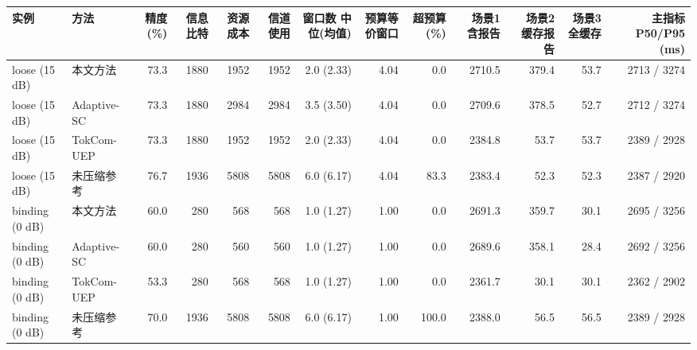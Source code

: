 \begin{tabular}{llrrrrrrrrrrr}
\hline
实例 & 方法 & 精度 (\%) & 信息比特 & 资源成本 & 信道使用 & 窗口数 中位(均值) & 预算等价窗口 & 超预算 (\%) & 场景1 含报告 & 场景2 缓存报告 & 场景3 全缓存 & 主指标 P50/P95 (ms)\\
\hline
loose (15 dB) & 本文方法 & 73.3 & 1880 & 1952 & 1952 & 2.0 (2.33) & 4.04 & 0.0 & 2710.5 & 379.4 & 53.7 & 2713 / 3274\\
loose (15 dB) & Adaptive-SC & 73.3 & 1880 & 2984 & 2984 & 3.5 (3.50) & 4.04 & 0.0 & 2709.6 & 378.5 & 52.7 & 2712 / 3274\\
loose (15 dB) & TokCom-UEP & 73.3 & 1880 & 1952 & 1952 & 2.0 (2.33) & 4.04 & 0.0 & 2384.8 & 53.7 & 53.7 & 2389 / 2928\\
loose (15 dB) & 未压缩参考 & 76.7 & 1936 & 5808 & 5808 & 6.0 (6.17) & 4.04 & 83.3 & 2383.4 & 52.3 & 52.3 & 2387 / 2920\\
binding (0 dB) & 本文方法 & 60.0 & 280 & 568 & 568 & 1.0 (1.27) & 1.00 & 0.0 & 2691.3 & 359.7 & 30.1 & 2695 / 3256\\
binding (0 dB) & Adaptive-SC & 60.0 & 280 & 560 & 560 & 1.0 (1.27) & 1.00 & 0.0 & 2689.6 & 358.1 & 28.4 & 2692 / 3256\\
binding (0 dB) & TokCom-UEP & 53.3 & 280 & 568 & 568 & 1.0 (1.27) & 1.00 & 0.0 & 2361.7 & 30.1 & 30.1 & 2362 / 2902\\
binding (0 dB) & 未压缩参考 & 70.0 & 1936 & 5808 & 5808 & 6.0 (6.17) & 1.00 & 100.0 & 2388.0 & 56.5 & 56.5 & 2389 / 2928\\
\hline
\end{tabular}
